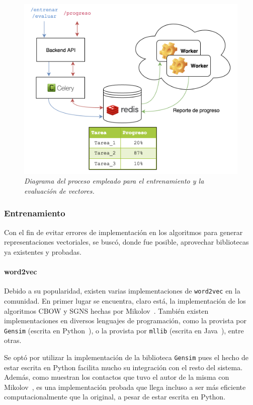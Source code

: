 \begin{figure}[h]
    \centering
    \includegraphics[width=\textwidth]{images/diag-tool-flow}
    \caption{\textit{Diagrama del proceso empleado para el entrenamiento y la evaluación de vectores.}}
    \label{fig:diag-tool-flow}
\end{figure}


\subsubsection{Entrenamiento}

Con el fin de evitar errores de implementación en los algoritmos para generar representaciones
vectoriales, se buscó, donde fue posible, aprovechar bibliotecas ya existentes y probadas.

\paragraph{word2vec}

Debido a su popularidad, existen varias implementaciones de \texttt{word2vec} en la comunidad. En
primer lugar se encuentra, claro está, la implementación de los algoritmos CBOW y SGNS hechas por
Mikolov~\cite{Word2vecGoogle}. También existen implementaciones en diversos lenguajes de programación,
como la provista por \texttt{Gensim} (escrita en Python~\cite{RehurekLrec}), o la provista por
\texttt{mllib} (escrita en Java~\cite{Word2vecMLlib}), entre otras.

Se optó por utilizar la implementación de la biblioteca \texttt{Gensim} pues el hecho de estar
escrita en Python facilita mucho su integración con el resto del sistema. Además, como muestran los
contactos que tuvo el autor de la misma con Mikolov~\cite{MikolovGoogleGroups}, es una implementación
probada que llega incluso a ser más eficiente computacionalmente que la original, a pesar de estar
escrita en Python.


